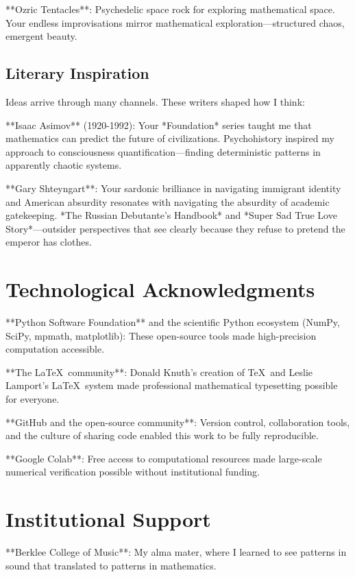 **Ozric Tentacles**: Psychedelic space rock for exploring mathematical space. Your endless improvisations mirror mathematical exploration—structured chaos, emergent beauty.

\subsection*{Literary Inspiration}

Ideas arrive through many channels. These writers shaped how I think:

**Isaac Asimov** (1920-1992): Your *Foundation* series taught me that mathematics can predict the future of civilizations. Psychohistory inspired my approach to consciousness quantification—finding deterministic patterns in apparently chaotic systems.

**Gary Shteyngart**: Your sardonic brilliance in navigating immigrant identity and American absurdity resonates with navigating the absurdity of academic gatekeeping. *The Russian Debutante's Handbook* and *Super Sad True Love Story*—outsider perspectives that see clearly because they refuse to pretend the emperor has clothes.

\section*{Technological Acknowledgments}

**Python Software Foundation** and the scientific Python ecosystem (NumPy, SciPy, mpmath, matplotlib): These open-source tools made high-precision computation accessible.

**The \LaTeX\ community**: Donald Knuth's creation of \TeX\ and Leslie Lamport's \LaTeX\ system made professional mathematical typesetting possible for everyone.

**GitHub and the open-source community**: Version control, collaboration tools, and the culture of sharing code enabled this work to be fully reproducible.

**Google Colab**: Free access to computational resources made large-scale numerical verification possible without institutional funding.

\section*{Institutional Support}

**Berklee College of Music**: My alma mater, where I learned to see patterns in sound that translated to patterns in mathematics.

